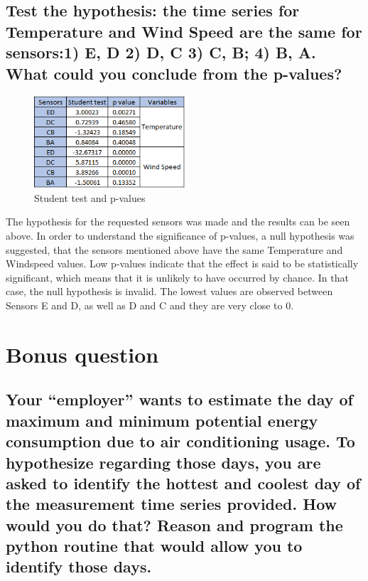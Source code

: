 \documentclass[a4paper,12pt]{article} %
\begin{document}
\subsection{Test the hypothesis: the time series for Temperature and Wind Speed are the same for sensors:1) E, D 2) D, C 3) C, B; 4) B, A. What could you conclude from the p-values?}

\begin{figure}[H] %
	\centering %
	\includegraphics[width=0.5\textwidth]{T_test.png} 
	\caption{Student test and p-values} %
\end{figure}

The hypothesis for the requested sensors was made and the results can be seen above. In order to understand the significance of p-values, a null hypothesis was suggested, that the sensors mentioned above have the same Temperature and Windspeed values. Low p-values indicate that the effect is said to be statistically
significant, which means that it is unlikely to have occurred by chance. In that case, the null hypothesis is invalid. The lowest values are observed between Sensors E and D, as well as D and C and they are very close to 0.

\section {Bonus question}

\subsection {Your “employer” wants to estimate the day of maximum and minimum potential energy consumption due to air conditioning usage. To hypothesize regarding those days, you are asked to identify the hottest and coolest day of the measurement time series provided. How would you do that? Reason and program the python routine that would allow you to identify those days.}
\end{document}
